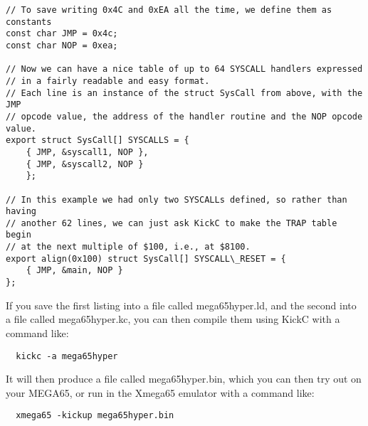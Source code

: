 \begin{tcolorbox}[colback=black,coltext=white]
\begin{verbatim}
// To save writing 0x4C and 0xEA all the time, we define them as constants
const char JMP = 0x4c;
const char NOP = 0xea;

// Now we can have a nice table of up to 64 SYSCALL handlers expressed
// in a fairly readable and easy format.
// Each line is an instance of the struct SysCall from above, with the JMP
// opcode value, the address of the handler routine and the NOP opcode value.
export struct SysCall[] SYSCALLS = {
    { JMP, &syscall1, NOP },
    { JMP, &syscall2, NOP }
    };

// In this example we had only two SYSCALLs defined, so rather than having
// another 62 lines, we can just ask KickC to make the TRAP table begin
// at the next multiple of $100, i.e., at $8100.
export align(0x100) struct SysCall[] SYSCALL\_RESET = {
    { JMP, &main, NOP }
};
\end{verbatim}
\end{tcolorbox}

If you save the first listing into a file called mega65hyper.ld, and the second
into a file called mega65hyper.kc, you can then compile them using KickC with
a command like:

\begin{tcolorbox}[colback=black,coltext=white]
\verbatimfont{\codefont}
\begin{verbatim}
  kickc -a mega65hyper
\end{verbatim}
\end{tcolorbox}

It will then produce a file called mega65hyper.bin, which you can then try out
on your MEGA65, or run in the Xmega65 emulator with a command like:

\begin{tcolorbox}[colback=black,coltext=white]
\verbatimfont{\codefont}
\begin{verbatim}
  xmega65 -kickup mega65hyper.bin
\end{verbatim}
\end{tcolorbox}

